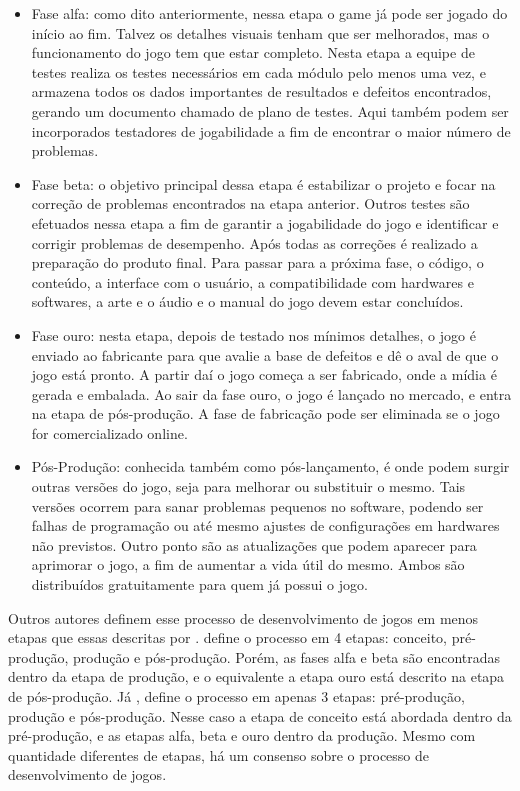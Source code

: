 \documentclass[quali]{ppgccufscar}
\begin{document}
\begin{itemize}
	\item Fase alfa: como dito anteriormente, nessa etapa o game já pode ser jogado do início ao fim. Talvez os detalhes visuais tenham que ser melhorados, mas o funcionamento do jogo tem que estar completo. Nesta etapa a equipe de testes realiza os testes necessários em cada módulo pelo menos uma vez, e armazena todos os dados importantes de resultados e defeitos encontrados, gerando um documento chamado de plano de testes. Aqui também podem ser incorporados testadores de jogabilidade a fim de encontrar o maior número de problemas.
	\item Fase beta: o objetivo principal dessa etapa é estabilizar o projeto e focar na correção de problemas encontrados na etapa anterior. Outros testes são efetuados nessa etapa a fim de garantir a jogabilidade do jogo e identificar e corrigir problemas de desempenho. Após todas as correções é realizado a preparação do produto final. Para passar para a próxima fase, o código, o conteúdo, a interface com o usuário, a compatibilidade com hardwares e softwares, a arte e o áudio e o manual do jogo devem estar concluídos.
	\item Fase ouro: nesta etapa, depois de testado nos mínimos detalhes, o jogo é enviado ao fabricante para que avalie a base de defeitos e dê o aval de que o jogo está pronto. A partir daí o jogo começa a ser fabricado, onde a mídia é gerada e embalada. Ao sair da fase ouro, o jogo é lançado no mercado, e entra na etapa de pós-produção. A fase de fabricação pode ser eliminada se o jogo for comercializado online.
	\item Pós-Produção: conhecida também como pós-lançamento, é onde podem surgir outras versões do jogo, seja para melhorar ou substituir o mesmo. Tais versões ocorrem para sanar problemas pequenos no software, podendo ser falhas de programação ou até mesmo ajustes de configurações em hardwares não previstos. Outro ponto são as atualizações que podem aparecer para aprimorar o jogo, a fim de aumentar a vida útil do mesmo. Ambos são distribuídos gratuitamente para quem já possui o jogo.
\end{itemize}

Outros autores definem esse processo de desenvolvimento de jogos em menos etapas que essas descritas por .  define o processo em 4 etapas: conceito, pré-produção, produção e pós-produção. Porém, as fases alfa e beta são encontradas dentro da etapa de produção, e o equivalente a etapa ouro está descrito na etapa de pós-produção. Já , define o processo em apenas 3 etapas: pré-produção, produção e pós-produção. Nesse caso a etapa de conceito está abordada dentro da pré-produção, e as etapas alfa, beta e ouro dentro da produção. Mesmo com quantidade diferentes de etapas, há um consenso sobre o processo de desenvolvimento de jogos.
\end{document}
